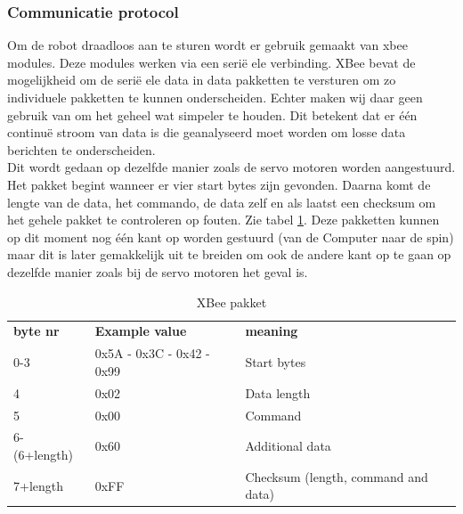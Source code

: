 \documentclass[10pt,a4paper]{article}
\begin{document}


\subsubsection{Communicatie protocol}
Om de robot draadloos aan te sturen wordt er gebruik gemaakt van xbee modules. Deze modules werken via een seri\"e ele verbinding. XBee bevat de mogelijkheid om de seri\"e ele data in data pakketten te versturen om zo individuele pakketten te kunnen onderscheiden. Echter maken wij daar geen gebruik van om het geheel wat simpeler te houden. Dit betekent dat er \' e\'en continu\"e stroom van data is die geanalyseerd moet worden om losse data berichten te onderscheiden.\\
Dit wordt gedaan op dezelfde manier zoals de servo motoren worden aangestuurd. Het pakket begint wanneer er vier start bytes zijn gevonden. Daarna komt de lengte van de data, het commando, de data zelf en als laatst een checksum om het gehele pakket te controleren op fouten. Zie tabel \ref{transmit-xbee}. Deze pakketten kunnen op dit moment nog \'e\'en kant op worden gestuurd (van de Computer naar de spin) maar dit is later gemakkelijk uit te breiden om ook de andere kant op te gaan op dezelfde manier zoals bij de servo motoren het geval is.
\begin{table}[h]
\centering
\begin{tabular}{lll}
\textbf{byte nr}      & \textbf{Example value}             & \textbf{meaning}                           \\
0-3          & 0x5A - 0x3C - 0x42 - 0x99 & Start bytes                       \\
4            & 0x02                      & Data length \\
5            & 0x00                      & Command                           \\
6-(6+length) & 0x60                      & Additional data                   \\
7+length     & 0xFF                      & Checksum (length, command and data)                  
\end{tabular}
\caption{XBee pakket}
\label{transmit-xbee}
\end{table}
\end{document}
